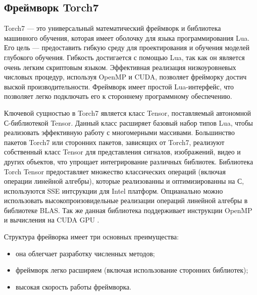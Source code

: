 \documentclass[a4paper,english,russian]{G2-105}
\begin{document}
\subsection{Фреймворк Torch7}
\par Torch7 --- это универсальный математический фреймворк и библиотека машинного обучения, которая имеет оболочку для языка программирования Lua. Его цель --- предоставить гибкую среду для проектирования и обучения моделей глубокого обучения. Гибкость достигается с помощью Lua, так как он является очень легким скриптовым языком. Эффективная реализация низкоуровневых числовых процедур, используя OpenMP и CUDA, позволяет фрейморку достич выской производительности. Фреймворк имеет простой Lua-интерфейс, что позволяет легко подключать его к стороннему программному обеспечению.
\par Ключевой сущностью в Torch7 является класс Tensor, поставляемый автономной С-библиотекой Tensor. Данный класс расширяет базовый набор типов Lua, чтобы реализовать эффективную работу с многомерными массивами. Большинство пакетов Torch7 или сторонних пакетов, зависящих от Torch7, реализуют собственный класс Tensor для представления сигналов, изображений, видео и других объектов, что упрощает интегрирование различных библиотек. Библиотека Torch Tensor предоставляет множество классических операций (включая операции линейной алгебры), которые реализованны и оптимизированны на С, используются SSE интсрукции для Intel платформ. Опцианально можно использовать высокопроизовидельные реализации операций линейной алгебры в библиотеке BLAS. Так же данная библиотека поддерживает инструкции OpenMP и вычисления на CUDA GPU \cite{13}.
\par Структура фрейворка имеет три основных преимущества:
\begin{itemize}
\item она облегчает разработку численных методов;
\item фреймворк легко расширяем (включая использование сторонних библиотек);
\item высокая скорость работы фреймворка.
\end{itemize}
\end{document}
